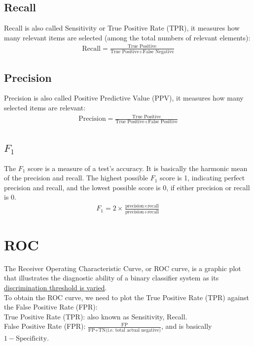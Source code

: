 	
	
\subsection{Recall}

Recall is also called Sensitivity or True Positive Rate (TPR), it measures how many relevant items are selected (among the total numbers of relevant elements):
\begin{eqnarray}
\text{Recall} = \frac{\text{True Positive}}{\text{True Positive}+\text{False Negative}}
\label{recall}
\end{eqnarray} 

\subsection{Precision}

Precision is also called Positive Predictive Value (PPV), it measures how many selected items are relevant:
\begin{eqnarray}
\text{Precision} = \frac{\text{True Positive}}{\text{True Positive}+\text{False Positive}}
\label{precision}
\end{eqnarray} 

\subsection{$F_1$}

The $F_1$ score is a measure of a test's accuracy. It is basically the harmonic mean of the precision and recall. The highest possible $F_1$ score is 1, indicating perfect precision and recall, and the lowest possible score is 0, if either precision or recall is 0.
\begin{eqnarray}
F_1 = 2 \times \frac{\text{precision}\times\text{recall}}{\text{precision} + \text{recall}}
\label{f1}
\end{eqnarray} 

\section{ROC}

The Receiver Operating Characteristic Curve, or ROC curve, is a graphic plot that illustrates the diagnostic ability of a binary classifier system as its \underline{discrimination threshold is varied}. \\

To obtain the ROC curve, we need to plot the True Positive Rate (TPR) against the False Positive Rate (FPR):\\
True Positive Rate (TPR): also known as Sensitivity, Recall.\\
False Positive Rate (FPR): $\frac{\text{FP}}{\text{FP}+\text{TN} \text{(i.e. total actual negative)}}$, and is basically $1 - \text{Specificity}$.\\


